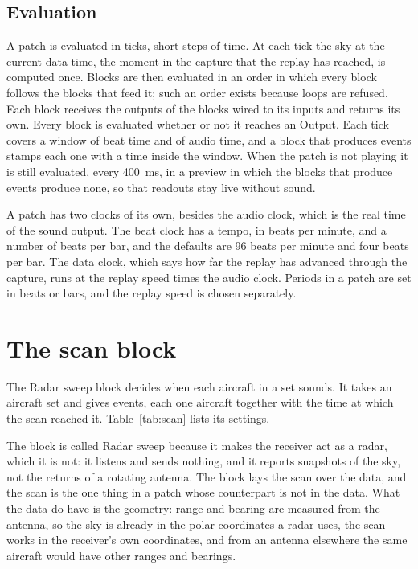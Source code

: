 \documentclass[11pt,letterpaper]{article}
\begin{document}
\subsection{Evaluation}

A patch is evaluated in ticks, short steps of time. At each tick the sky at the current data time, the moment in the capture that the replay has reached, is computed once. Blocks are then evaluated in an order in which every block follows the blocks that feed it; such an order exists because loops are refused. Each block receives the outputs of the blocks wired to its inputs and returns its own. Every block is evaluated whether or not it reaches an Output. Each tick covers a window of beat time and of audio time, and a block that produces events stamps each one with a time inside the window. When the patch is not playing it is still evaluated, every 400~ms, in a preview in which the blocks that produce events produce none, so that readouts stay live without sound.

A patch has two clocks of its own, besides the audio clock, which is the real time of the sound output. The beat clock has a tempo, in beats per minute, and a number of beats per bar, and the defaults are 96 beats per minute and four beats per bar. The data clock, which says how far the replay has advanced through the capture, runs at the replay speed times the audio clock. Periods in a patch are set in beats or bars, and the replay speed is chosen separately.

\section{The scan block}\label{sec:scan}

The Radar sweep block decides when each aircraft in a set sounds. It takes an aircraft set and gives events, each one aircraft together with the time at which the scan reached it. Table~\ref{tab:scan} lists its settings.

The block is called Radar sweep because it makes the receiver act as a radar, which it is not: it listens and sends nothing, and it reports snapshots of the sky, not the returns of a rotating antenna. The block lays the scan over the data, and the scan is the one thing in a patch whose counterpart is not in the data. What the data do have is the geometry: range and bearing are measured from the antenna, so the sky is already in the polar coordinates a radar uses, the scan works in the receiver's own coordinates, and from an antenna elsewhere the same aircraft would have other ranges and bearings.
\end{document}
